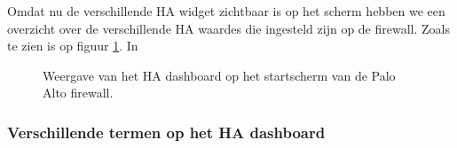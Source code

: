Omdat nu de verschillende HA widget zichtbaar is op het scherm hebben we een overzicht over de verschillende HA waardes die ingesteld zijn op de firewall. Zoals te zien is op figuur \ref{fig:PA_High_Availability_Dashboard}. In 

\begin{figure}[H]
    \centering
    \caption[PA High Availability Dashboard]{\label{fig:PA_High_Availability_Dashboard} Weergave van het HA dashboard op het startscherm van de Palo Alto firewall.}
\end{figure}

\subsubsection{Verschillende termen op het HA dashboard}


